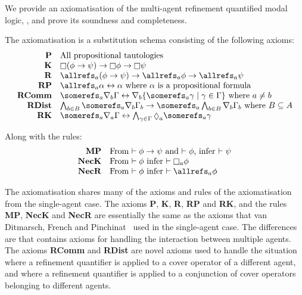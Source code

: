 We provide an axiomatisation of the multi-agent refinement quantified modal
logic, \logicKF{}, and prove its soundness and completeness.
\begin{definition}
The axiomatisation \axiomKF{} is a substitution schema consisting of the
following axioms:
$$
\begin{array}{rl}
{\bf P} & \text{All propositional tautologies}\\
{\bf K} & \knows (\phi \implies \psi) \implies \knows \phi \implies \knows
\psi\\
{\bf R} & \allrefs_a (\phi \implies \psi) \implies \allrefs_a \phi \implies
\allrefs_a \psi\\
{\bf RP} & \allrefs_a \alpha \iff \alpha \text{ where $\alpha$ is a
propositional formula}\\
{\bf RComm} & \somerefs_a \covers_b \Gamma \iff \covers_b \{\somerefs_a \gamma
\mid \gamma \in \Gamma\} \text{ where $a \neq b$}\\
{\bf RDist} & \bigwedge_{b \in B} \somerefs_a \covers_b \Gamma_b \implies
\somerefs_a \bigwedge_{b \in B} \covers_b \Gamma_b \text{ where $B \subseteq A$}\\
{\bf RK} & \somerefs_a \covers_a \Gamma \iff \bigwedge_{\gamma \in \Gamma}
\suspects_a \somerefs_a \gamma\\
\end{array}
$$

Along with the rules:
$$
\begin{array}{rl}
{\bf MP} & \text{From $\proves \phi \implies \psi$ and $\proves \phi$, infer
$\proves \psi$}\\
{\bf NecK} & \text{From $\proves \phi$ infer $\proves \knows_a \phi$}\\
{\bf NecR} & \text{From $\proves \phi$ infer $\proves \allrefs_a \phi$}
\end{array}
$$
\end{definition}

The axiomatisation \axiomKF{} shares many of the axioms and rules of the
axiomatisation from the single-agent case. The axioms {\bf P}, {\bf K}, {\bf R},
{\bf RP} and {\bf RK}, and the rules {\bf MP}, {\bf NecK} and {\bf NecR} are
essentially the same as the axioms that van Ditmarsch, French and
Pinchinat~\cite{french2010future} used in the single-agent case. The differences
are that \axiomKF{} contains axioms for handling the interaction between
multiple agents. The axioms {\bf RComm} and {\bf RDist} are novel axioms used to
handle the situation where a refinement quantifier is applied to a cover
operator of a different agent, and where a refinement quantifier is applied to a
conjunction of cover operators belonging to different agents.

